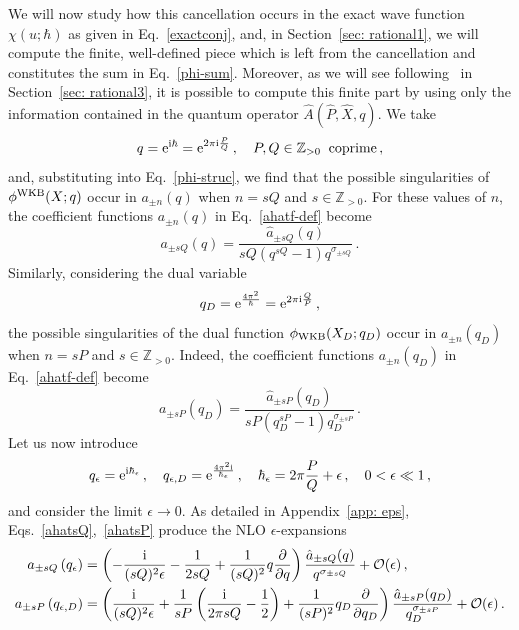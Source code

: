 \documentclass[a4paper,11pt]{article}
\theoremstyle{definition}
\newcommand{\CO}{{\cal O}}
\def\IZ{{\mathbb Z}}
\def\e{\epsilon}
\newcommand{\re}{{\rm e}}
\newcommand{\ri}{{\rm i}}
\renewcommand{\d}{\partial}
\newcommand{\be}{\begin{equation}}
\newcommand{\ee}{\end{equation}}
\begin{document}
We will now study how this cancellation occurs in the exact wave function $\chi(u;\hbar)$ as given in Eq.~\eqref{exactconj}, and, in Section~\ref{sec: rational1}, we will 
compute the finite, well-defined piece which is left from the cancellation and constitutes the sum in Eq.~\eqref{phi-sum}. Moreover, as we will see following~\cite{szabolcs} in Section~\ref{sec: rational3}, it is possible to compute this finite part by using only the information contained in the quantum operator $\hat{A}(\hat{P}, \hat{X},q)$. 
We take 
\be
q=\re^{\ri \hbar}=\re^{2 \pi \ri {P \over Q}} \, , \quad  P,Q \in \IZ_{>0} \; \; \text{coprime} \, , 
\ee
and, substituting into Eq.~\eqref{phi-struc}, we find that the possible singularities of $\phi^{\rm WKB} (X; q)$ occur in $a_{\pm n}(q)$ when $n=s Q$ and $s \in \IZ_{>0}$. For these values of $n$, the coefficient functions $a_{\pm n}(q)$ in Eq.~\eqref{ahatf-def} become
\be \label{ahatsQ}
a_{\pm s Q}\left(q \right) = \frac{\hat{a}_{ \pm sQ}\left( q \right)}{sQ (q^{sQ}-1) q^{ \sigma_{\pm sQ}}} \, .
\ee
Similarly, considering the dual variable
\be
q_D=\re^{{4 \pi^2 \over \hbar}}=\re^{2 \pi \ri {Q \over P}} \, , 
\ee
the possible singularities of the dual function $\phi_{\rm WKB} (X_D; q_D)$ occur in $a_{\pm n} (q_D)$ when $n=s P$ and $s \in \IZ_{>0}$. Indeed, the coefficient functions $a_{\pm n}(q_D)$ in Eq.~\eqref{ahatf-def} become
\be \label{ahatsP}
a_{\pm s P}\left( q_D\right) = \frac{\hat{a}_{\pm sP}\left( q_D \right)}{sP (q_D^{sP}-1) q_D^{ \sigma_{\pm sP}}}  \, .
\ee
%
Let us now introduce
\be \label{hbareps}
q_{\e}= \re^{\ri \hbar_{\e}} \, , \quad q_{\e, D}= \re^{{ 4 \pi^2 \ri \over  \hbar_{\e}}} \, , \quad \hbar_{\e}=  2 \pi {P \over Q}+ \epsilon \, , \quad 0 < \e \ll 1 \, ,
\ee
and consider the limit $\e \rightarrow 0$. As detailed in Appendix~\ref{app: eps}, Eqs.~\eqref{ahatsQ},~\eqref{ahatsP} produce the NLO $\e$-expansions
\begin{subequations}
\begin{align}
a_{\pm s Q}\left( q_{\e} \right) &= \left(- \frac{\ri}{(sQ)^2 \e} -\frac{1}{2sQ} + \frac{1}{(sQ)^2} q \frac{\d }{\d q} \right) \frac{ \hat{a}_{\pm sQ}(q) }{q^{\sigma_{\pm sQ}}} + \CO(\e) \, , \label{pole} \\
a_{\pm s P}\left( q_{\e, D} \right) &= \left( \frac{\ri}{(sQ)^2 \e} +\frac{1}{sP}\left(\frac{\ri}{2 \pi sQ}- {1 \over 2} \right) + \frac{1}{(sP)^2} q_D \frac{\d }{\d q_D} \right) \frac{ \hat{a}_{\pm sP}(q_D)}{q_D^{\sigma_{\pm sP}}}  + \CO(\e) \, . \label{poleD}
\end{align}
\end{subequations}
\end{document}

